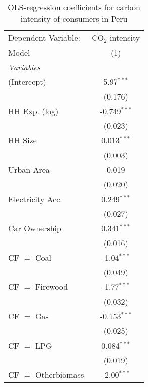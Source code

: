 
\begin{table}[htbp!]
   \centering
   \small
   \begin{adjustbox}{width = 1\textwidth, max height = 0.95\textheight, center}
      \begin{threeparttable}[b]
         \caption{\label{tab:OLS_1_PER} OLS-regression coefficients for carbon intensity of consumers in Peru}
         \begin{tabular}{lc}
            \tabularnewline \midrule \midrule
            Dependent Variable: & CO$_{2}$ intensity\\  
            Model               & (1)\\  
            \midrule
            \emph{Variables}\\
            (Intercept)         & 5.97$^{***}$\\   
                                & (0.176)\\   
            HH Exp. (log)       & -0.749$^{***}$\\   
                                & (0.023)\\   
            HH Size             & 0.013$^{***}$\\   
                                & (0.003)\\   
            Urban Area          & 0.019\\   
                                & (0.020)\\   
            Electricity Acc.    & 0.249$^{***}$\\   
                                & (0.027)\\   
            Car Ownership       & 0.341$^{***}$\\   
                                & (0.016)\\   
            CF $=$ Coal         & -1.04$^{***}$\\   
                                & (0.049)\\   
            CF $=$ Firewood     & -1.77$^{***}$\\   
                                & (0.032)\\   
            CF $=$ Gas          & -0.153$^{***}$\\   
                                & (0.025)\\   
            CF $=$ LPG          & 0.084$^{***}$\\   
                                & (0.019)\\   
            CF $=$ Otherbiomass & -2.00$^{***}$\\   

\end{tabular}
\end{threeparttable}
\end{adjustbox}
\end{table}
